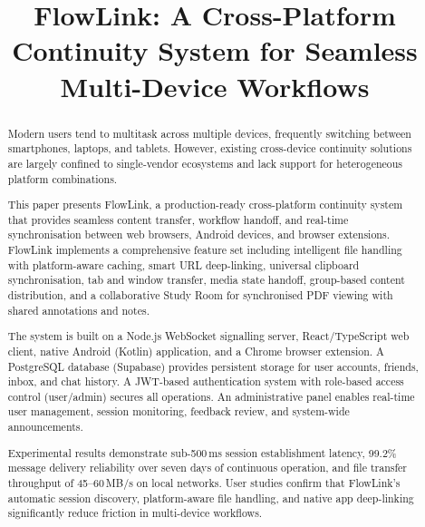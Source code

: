 \documentclass[conference]{IEEEtran}
\begin{document}
\title{FlowLink: A Cross-Platform Continuity System for Seamless Multi-Device Workflows}
\author{
    \and
}

\maketitle
\IEEEpeerreviewmaketitle

\begin{abstract}
Modern users tend to multitask across multiple devices, frequently switching between smartphones, laptops, and tablets. However, existing cross-device continuity solutions are largely confined to single-vendor ecosystems and lack support for heterogeneous platform combinations.

This paper presents FlowLink, a production-ready cross-platform continuity system that provides seamless content transfer, workflow handoff, and real-time synchronisation between web browsers, Android devices, and browser extensions. FlowLink implements a comprehensive feature set including intelligent file handling with platform-aware caching, smart URL deep-linking, universal clipboard synchronisation, tab and window transfer, media state handoff, group-based content distribution, and a collaborative Study Room for synchronised PDF viewing with shared annotations and notes.

The system is built on a Node.js WebSocket signalling server, React/TypeScript web client, native Android (Kotlin) application, and a Chrome browser extension. A PostgreSQL database (Supabase) provides persistent storage for user accounts, friends, inbox, and chat history. A JWT-based authentication system with role-based access control (user/admin) secures all operations. An administrative panel enables real-time user management, session monitoring, feedback review, and system-wide announcements.

Experimental results demonstrate sub-500\,ms session establishment latency, 99.2\% message delivery reliability over seven days of continuous operation, and file transfer throughput of 45--60\,MB/s on local networks. User studies confirm that FlowLink's automatic session discovery, platform-aware file handling, and native app deep-linking significantly reduce friction in multi-device workflows.
\end{abstract}
\end{document}
